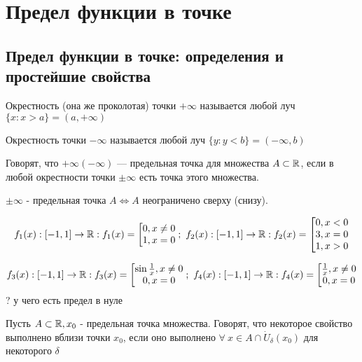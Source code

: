 \documentclass[12pt]{report}
\begin{document}
\chapter{Предел функции в точке}

\section{Предел функции в точке: определения и простейшие свойства}
\begin{defn}
Окрестность (она же проколотая) точки $+\infty$ называется любой луч $\{x: x > a\} = (a, +\infty)$

Окрестность точки $-\infty$ называется любой луч $\{y: y < b\} = (-\infty, b)$

Говорят, что $+\infty (-\infty)$ --- предельная точка для множества $A \subset \mathbb{R}$, если в любой окрестности точки $\pm \infty$ есть точка этого множества.
\end{defn}

\begin{st}
$\pm \infty$ - предельная точка $A \Leftrightarrow A$ неограничено сверху (снизу).
\end{st}

\begin{ex}
$$f_1(x): [-1, 1] \to \mathbb{R}: f_1(x) = 
\left[
\begin{matrix}
0, x \neq 0\\
1, x = 0
\end{matrix}
\right.;
~f_2(x): [-1, 1] \to \mathbb{R}: f_2(x) = 
\left[
\begin{matrix}
0, x < 0\\
3, x = 0\\
1, x > 0
\end{matrix}
\right.
$$

$$f_3(x): [-1, 1] \to \mathbb{R}: f_3(x) = 
\left[
\begin{matrix}
\sin{\frac{1}{x}}, x \neq 0\\
0, x = 0
\end{matrix}
\right.;
~f_4(x): [-1, 1] \to \mathbb{R}: f_4(x) = 
\left[
\begin{matrix}
\frac{1}{x}, x \neq 0\\
0, x = 0
\end{matrix}
\right.
$$
? у чего есть предел в нуле
\end{ex}

\begin{defn}[Соглашение]
Пусть $A \subset \mathbb{R}, x_0$ - предельная точка множества. Говорят, что некоторое свойство выполнено вблизи точки $x_0$, если оно выполнено $\forall ~x \in A \cap \dot U_\delta(x_0)$ для некоторого $\delta$
\end{defn}
\end{document}
